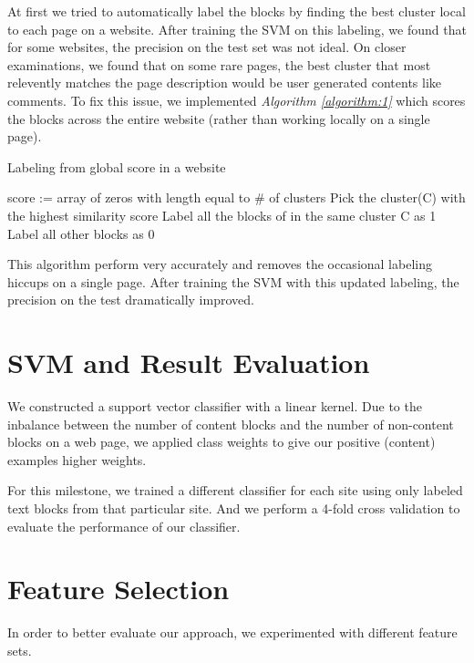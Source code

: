 \documentclass{acm_proc_article-sp}
\begin{document}
At first we tried to automatically label the blocks by finding the best cluster local to each page on a website. After training the SVM on this labeling, we found that for some websites, the precision on the test set was not ideal. On closer examinations, we found that on some rare pages, the best cluster that most relevently matches the page description would be user generated contents like comments. To fix this issue, we implemented \emph{Algorithm \ref{algorithm:1}} which scores the blocks across the entire website (rather than working locally on a single page).

\begin{algorithm}
\caption{\label{algorithm:1}Labeling from global score in a website}

 \SetLine
 score := {array of zeros with length equal to \# of clusters}\;
 Pick the cluster(C) with the highest similarity score\;
 Label all the blocks of in the same cluster C as 1\;
 Label all other blocks as 0\;

\end{algorithm}

This algorithm perform very accurately and removes the occasional labeling hiccups on a single page. After training the SVM with this updated labeling, the precision on the test dramatically improved.

\section{SVM and Result Evaluation}

We constructed a support vector classifier with a linear kernel. Due to the inbalance between the number of content blocks and the number of non-content blocks on a web page, we applied class weights to give our positive (content) examples higher weights.

For this milestone, we trained a different classifier for each site using only labeled text blocks from that particular site. And we perform a 4-fold cross validation to evaluate the performance of our classifier.

\section{Feature Selection}

In order to better evaluate our approach, we experimented with different feature sets.
\end{document}
